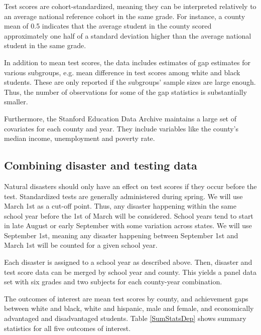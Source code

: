 Test scores are cohort-standardized, meaning they can be interpreted relatively to an average national reference cohort in the same grade. For instance, a county mean of 0.5 indicates that the average student in the county scored approximately one half of a standard deviation higher than the average national student in the same grade.

In addition to mean test scores, the data includes estimates of gap estimates for various subgroups, e.g. mean difference in test scores among white and black students. These are only reported if the subgroups' sample sizes are large enough. Thus, the number of observations for some of the gap statistics is substantially smaller.

Furthermore, the Stanford Education Data Archive maintains a large set of covariates for each county and year. They include variables like the county's median income, unemployment and poverty rate.


\subsection{Combining disaster and testing data}

Natural disasters should only have an effect on test scores if they occur before the test. Standardized tests are generally administered during spring. We will use March 1st as a cut-off point. Thus, any disaster happening within the same school year before the 1st of March will be considered. School years tend to start in late August or early September with some variation across states. We will use September 1st, meaning any disaster happening between September 1st and March 1st will be counted for a given school year.

Each disaster is assigned to a school year as described above. Then, disaster and test score data can be merged by school year and county. This yields a panel data set with six grades and two subjects for each county-year combination.

The outcomes of interest are mean test scores by county, and achievement gaps between white and black, white and hispanic, male and female, and economically advantaged and disadvantaged students. Table \ref{SumStatsDep} shows summary statistics for all five outcomes of interest. 










